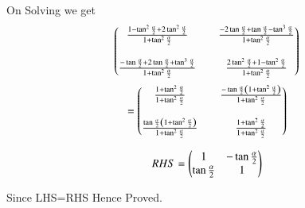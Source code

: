 \documentclass[journal,12pt,onecolumn]{IEEEtran}
\begin{document}
On Solving we get
\begin{align}
    \begin{pmatrix}\frac{1-\tan^2\frac{\alpha}{2}+2\tan^2\frac{\alpha}{2}}{1+\tan^2\frac{\alpha}{2}} && \frac{-2\tan\frac{\alpha}{2}+\tan\frac{\alpha}{2}-\tan^3\frac{\alpha}{2}}{1+\tan^2\frac{\alpha}{2}} \\ \\ \frac{-\tan\frac{\alpha}{2}+2\tan\frac{\alpha}{2}+\tan^3\frac{\alpha}{2}}{1+\tan^2\frac{\alpha}{2}} && \frac{2\tan^2\frac{\alpha}{2}+1-\tan^2\frac{\alpha}{2}}{1+\tan^2\frac{\alpha}{2}}\end{pmatrix}
\end{align}
\begin{align}
    =\begin{pmatrix}\frac{1+\tan^2\frac{\alpha}{2}}{1+\tan^2\frac{\alpha}{2}} && \frac{-\tan\frac{\alpha}{2}\left(1+\tan^2\frac{\alpha}{2}\right)}{1+\tan^2\frac{\alpha}{2}} \\ \\ \frac{\tan\frac{\alpha}{2}\left(1+\tan^2\frac{\alpha}{2}\right)}{1+\tan^2\frac{\alpha}{2}} && \frac{1+\tan^2\frac{\alpha}{2}}{1+\tan^2\frac{\alpha}{2}}  \end{pmatrix}
\end{align}

\begin{align}
 RHS=\begin{pmatrix}1 &  -\tan\frac{\alpha}{2} \\ \tan\frac{\alpha}{2} & 1 \end{pmatrix}   
\end{align}

Since LHS=RHS Hence Proved.
\end{document}
